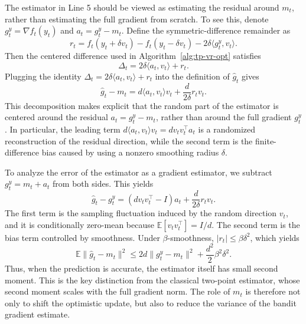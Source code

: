 \documentclass[journal,onecolumn]{IEEEtran}
\theoremstyle{plain}
\theoremstyle{definition}
\theoremstyle{remark}
\begin{document}
The estimator in Line 5 should be viewed as estimating the residual around
$m_t$, rather than estimating the full gradient from scratch. To see this, denote
$g_t^y=\nabla f_t(y_t)$ and $a_t=g_t^y-m_t$. Define the symmetric-difference remainder as
\begin{equation*}
    r_t=
    f_t(y_t+\delta v_t)-f_t(y_t-\delta v_t)
    -2\delta\langle g_t^y,v_t\rangle.
\end{equation*}
Then the centered difference used in Algorithm~\ref{alg:tp-vr-opt} satisfies
\begin{equation*}
    \Delta_t
    =
    2\delta\langle a_t,v_t\rangle+r_t.
\end{equation*}
Plugging the identity $\Delta_t=2\delta\langle a_t,v_t\rangle+r_t$ into the
definition of $\widehat g_t$ gives
\begin{equation*}
    \widehat g_t-m_t
    =
    d\langle a_t,v_t\rangle v_t
    +
    \frac{d}{2\delta}r_t v_t .
\end{equation*}
This decomposition makes explicit that the random part of the estimator is
centered around the residual $a_t=g_t^y-m_t$, rather than around the full
gradient $g_t^y$. In particular, the leading term
$d\langle a_t,v_t\rangle v_t=dv_tv_t^\top a_t$ is a randomized reconstruction of
the residual direction, while the second term is the finite-difference bias
caused by using a nonzero smoothing radius $\delta$.

To analyze the error of the estimator as a gradient estimator, we subtract
$g_t^y=m_t+a_t$ from both sides. This yields
\begin{equation*}
    \widehat g_t-g_t^y
    =
    (d v_t v_t^\top-I)a_t
    +
    \frac{d}{2\delta}r_t v_t .
\end{equation*}
The first term is the sampling fluctuation induced by the random direction
$v_t$, and it is conditionally zero-mean because
$\mathbb E[v_t v_t^\top]=I/d$. The second term is the bias term controlled by
smoothness. Under
$\beta$-smoothness, $|r_t|\le \beta\delta^2$, which yields
\begin{equation*}
    \mathbb E\|\widehat g_t-m_t\|^2
    \le
    2d\|g_t^y-m_t\|^2
    +
    \frac{d^2}{2}\beta^2\delta^2 .
\end{equation*}
Thus, when the prediction is accurate, the estimator itself has small second
moment. This is the key distinction from the classical two-point estimator,
whose second moment scales with the full gradient norm. The role of $m_t$ is
therefore not only to shift the optimistic update, but also to reduce the
variance of the bandit gradient estimate.
\end{document}
